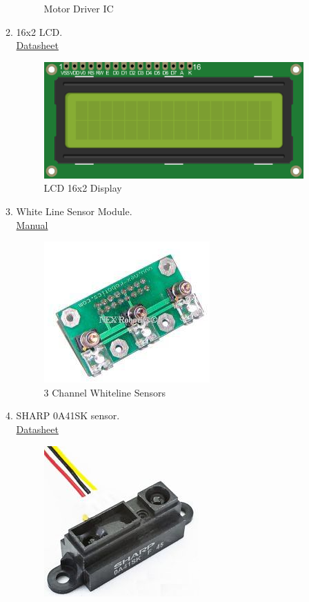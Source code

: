 \documentclass[a4paper,12pt,oneside]{book}
\begin{document}
\begin{itemize}
\begin{enumerate}
\begin{figure}[!ht]
        \caption{Motor Driver IC}
      \end{figure}
      \newpage
    \item 16x2 LCD.\\
    \href{http://www.engineersgarage.com/sites/default/files/LCD\%2016x2.pdf}{ Datasheet}\par
   \begin{figure}[!ht]
        \centering
        \includegraphics[scale=0.85]{lcd}
        \caption{LCD 16x2 Display}
      \end{figure}
    \item White Line Sensor Module.\\
    \href{http://www.nex-robotics.com/images/downloads/3\%20channel\%20line\%20sensor.pdf}{ Manual}\par
   \begin{figure}[!ht]
        \centering
        \includegraphics[scale=0.85]{whiteline}
        \caption{3 Channel Whiteline Sensors}
      \end{figure}
    \item SHARP 0A41SK sensor.\\
    \href{http://www.sharp-world.com/products/device/lineup/data/pdf/datasheet/gp2y0a41sk_e.pdf}{ Datasheet}\par
   \begin{figure}[!ht]
        \centering
        \includegraphics[scale=0.8]{sharp}

\end{figure}
\end{enumerate}
\end{itemize}
\end{document}
